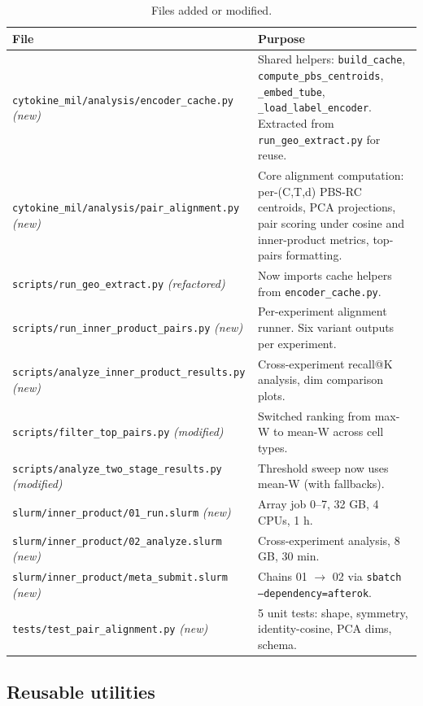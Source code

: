 \documentclass[11pt,a4paper]{article}
\newcommand{\codeword}[1]{\texttt{\small #1}}
\begin{document}
\begin{table}[h]
\centering
\caption{Files added or modified.}
\label{tab:files}
\footnotesize
\begin{tabular}{p{6.5cm}p{8cm}}
\toprule
\textbf{File} & \textbf{Purpose} \\
\midrule
\codeword{cytokine\_mil/analysis/encoder\_cache.py} \textit{(new)}
& Shared helpers: \codeword{build\_cache}, \codeword{compute\_pbs\_centroids},
  \codeword{\_embed\_tube}, \codeword{\_load\_label\_encoder}. Extracted from
  \codeword{run\_geo\_extract.py} for reuse. \\
\codeword{cytokine\_mil/analysis/pair\_alignment.py} \textit{(new)}
& Core alignment computation: per-(C,T,d) PBS-RC centroids, PCA projections,
  pair scoring under cosine and inner-product metrics, top-pairs formatting. \\
\codeword{scripts/run\_geo\_extract.py} \textit{(refactored)}
& Now imports cache helpers from \codeword{encoder\_cache.py}. \\
\codeword{scripts/run\_inner\_product\_pairs.py} \textit{(new)}
& Per-experiment alignment runner. Six variant outputs per experiment. \\
\codeword{scripts/analyze\_inner\_product\_results.py} \textit{(new)}
& Cross-experiment recall@K analysis, dim comparison plots. \\
\codeword{scripts/filter\_top\_pairs.py} \textit{(modified)}
& Switched ranking from max-W to mean-W across cell types. \\
\codeword{scripts/analyze\_two\_stage\_results.py} \textit{(modified)}
& Threshold sweep now uses mean-W (with fallbacks). \\
\codeword{slurm/inner\_product/01\_run.slurm} \textit{(new)}
& Array job 0--7, 32 GB, 4 CPUs, 1 h. \\
\codeword{slurm/inner\_product/02\_analyze.slurm} \textit{(new)}
& Cross-experiment analysis, 8 GB, 30 min. \\
\codeword{slurm/inner\_product/meta\_submit.slurm} \textit{(new)}
& Chains 01 $\to$ 02 via \codeword{sbatch --dependency=afterok}. \\
\codeword{tests/test\_pair\_alignment.py} \textit{(new)}
& 5 unit tests: shape, symmetry, identity-cosine, PCA dims, schema. \\
\bottomrule
\end{tabular}
\end{table}

\subsection{Reusable utilities}
\end{document}
